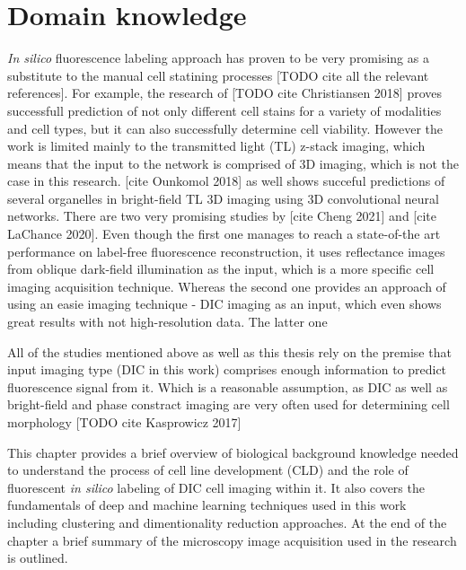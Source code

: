 \section{Domain knowledge}

    \textit{In silico} fluorescence labeling approach has proven to be very promising as a substitute to the manual cell statining processes [TODO cite all the relevant references]. For example, the research of [TODO cite Christiansen 2018] proves successfull prediction of not only different cell stains for a variety of modalities and cell types, but it can also successfully determine cell viability. However the work is limited mainly to the transmitted light (TL) z-stack imaging, which means that the input to the network is comprised of 3D imaging, which is not the case in this research. [cite Ounkomol 2018] as well shows succeful predictions of several organelles in bright-field TL 3D imaging using 3D convolutional neural networks. There are two very promising studies by [cite Cheng 2021] and [cite LaChance 2020]. Even though the first one manages to reach a state-of-the art performance on label-free fluorescence reconstruction, it uses reflectance images from oblique dark-field illumination as the input, which is a more specific cell imaging acquisition technique. Whereas the second one provides an approach of using an easie imaging technique - DIC imaging as an input, which even shows great results with not high-resolution data. The latter one 
    
    All of the studies mentioned above as well as this thesis rely on the premise that input imaging type (DIC in this work) comprises enough information to predict fluorescence signal from it. Which is a reasonable assumption, as DIC as well as bright-field and phase constract imaging are very often used for determining cell morphology [TODO cite Kasprowicz 2017]

    This chapter provides a brief overview of biological background knowledge needed to understand the process of cell line development (CLD) and the role of fluorescent \textit{in silico} labeling of DIC cell imaging within it. It also covers the fundamentals of deep and machine learning techniques used in this work including clustering and dimentionality reduction approaches. At the end of the chapter a brief summary of the microscopy image acquisition used in the research is outlined.
